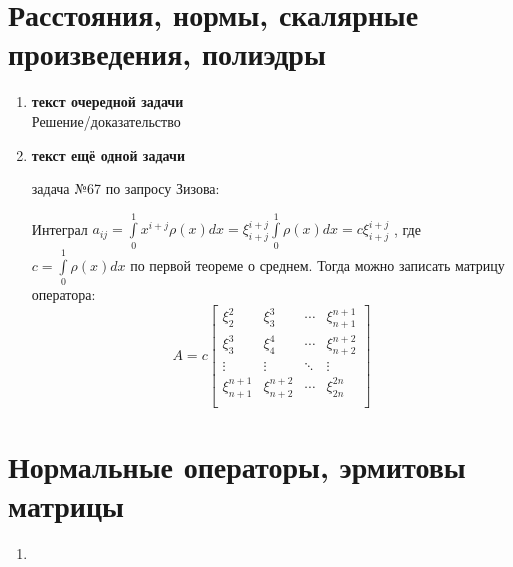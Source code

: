 \documentclass[12pt]{article} %
\begin{document}
\section{Расстояния, нормы, скалярные произведения, полиэдры}
\begin{enumerate}%
    \item \textbf{текст очередной задачи}\\

    Решение/доказательство
    \item \textbf{текст ещё одной задачи}%



задача №67 по запросу Зизова:

Интеграл $a_{ij} = \int \limits_{0}^{1} x^{i + j} \rho(x)dx = \xi_{i + j}^{i + j} \int \limits_{0}^{1} \rho(x)dx = c \xi_{i + j}^{i + j}$ , где $c = \int \limits_{0}^{1} \rho(x)dx$ по первой теореме о среднем. Тогда можно записать матрицу оператора:
\[
A = c
\begin{bmatrix}
    \xi_2^2 & \xi_3^3 & \cdots & \xi_{n + 1}^{n + 1}\\
    \xi_3^3 & \xi_4^4 & \cdots & \xi_{n + 2}^{n + 2}\\
    \vdots & \vdots & \ddots & \vdots \\
    \xi_{n + 1}^{n + 1} & \xi_{n + 2}^{n + 2} & \cdots & \xi_{2n}^{2n}\\
\end{bmatrix}
\]

\end{enumerate}
\section{Нормальные операторы, эрмитовы матрицы}
\begin{enumerate}
    \item 
\end{enumerate}

\end{document}
